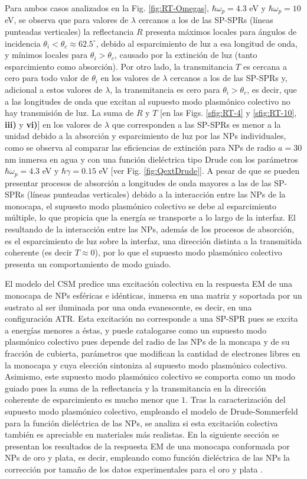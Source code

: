 Para ambos casos analizados en la Fig. \ref{fig:RT-Omegas}, $\hbar\omega_p = 4.3$ eV y $\hbar\omega_p = 10$ eV, se observa que para valores de $\lambda$ cercanos a los de las SP-SPRs (líneas punteadas verticales) la reflectancia $R$ presenta máximos locales para ángulos de incidencia $\theta_i<\theta_c \approx 62.5^\circ$, debido al esparcimiento de luz a esa longitud de onda, y mínimos locales para $\theta_i>\theta_c$, causado por la extinción de luz (tanto esparcimiento como absorción). Por otro lado, la transmitancia $T$ es cercana a cero para todo valor de $\theta_i$ en los valores de $\lambda$ cercanos a los de las SP-SPRs y, adicional a estos valores de $\lambda$, la transmitancia es cero para $\theta_i>\theta_c$, es decir, que a las longitudes de onda que excitan al supuesto modo plasmónico colectivo no hay transmisión de luz. La suma de $R$ y $T$ [en las Figs. \ref{sfig:RT-4} y \ref{sfig:RT-10}, \textbf{iii)} y \textbf{vi)}] en los valores de $\lambda$ que corresponden a las SP-SPRs es menor a la unidad debido a la absorción y esparcimiento de luz por las NPs individuales, como se observa al comparar las eficiencias de extinción para NPs de radio $a=30$ nm inmersa en agua y con una función dieléctrica tipo Drude con los parámetros $\hbar\omega_p=4.3$ eV  y $\hbar\gamma=0.15$ eV [ver  Fig. \ref{fig:QextDrude}]. A pesar de que se pueden presentar procesos de  absorción a longitudes de onda mayores a las de las SP-SPRs (líneas punteadas verticales) debido a la interacción entre las NPs de la monocapa, el supuesto modo plasmónico colectivo se debe al esparcimiento múltiple, lo que propicia que la energía se transporte a lo largo de la interfaz. El resultando de la interacción entre las NPs, además de los procesos de absorción, es el esparcimiento de luz sobre la interfaz, una dirección distinta a la transmitida coherente (es decir $T\approx 0$), por lo que el supuesto modo plasmónico colectivo presenta un comportamiento de modo guiado.

El modelo del CSM predice una excitación colectiva en la respuesta EM de una monocapa de NPs esféricas e idénticas, inmersa en una matriz y soportada por un sustrato al ser iluminada por una onda evanescente, es decir, en una configuración ATR. Esta excitación no corresponde a una SP-SPR pues se excita a energías menores a éstas, y puede catalogarse como un supuesto modo plasmónico colectivo pues depende del radio de las NPs de la moncapa y de su fracción de cubierta, parámetros que modifican la cantidad de electrones libres en la monocapa y cuya elección sintoniza al supuesto modo plasmónico colectivo. Asimismo, este supuesto modo plasmónico colectivo se comporta como un modo guiado pues la suma de la reflectancia y la transmitancia en la dirección coherente de esparcimiento es mucho menor que $1$. Tras la caracterización del supuesto modo plasmónico colectivo, empleando el modelo de Drude-Sommerfeld para la función dieléctrica de las NPs, se analiza si esta excitación colectiva también es apreciable en materiales más realistas. En la siguiente sección se presentan los resultados de la respuesta EM de una monocapa conformada por NPs de oro y plata, es decir, empleando como función dieléctrica de las NPs la corrección por tamaño de los datos experimentales para el oro y plata \cite{johnson1972constants}.

